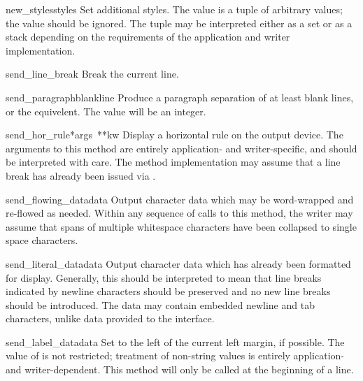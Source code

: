 \begin{funcdesc}{new_styles}{styles}
Set additional styles.  The  value is a tuple of
arbitrary values; the value  should be ignored.  The
 tuple may be interpreted either as a set or as a stack
depending on the requirements of the application and writer
implementation.
\end{funcdesc}

\begin{funcdesc}{send_line_break}{}
Break the current line.
\end{funcdesc}

\begin{funcdesc}{send_paragraph}{blankline}
Produce a paragraph separation of at least  blank
lines, or the equivelent.  The  value will be an
integer.
\end{funcdesc}

\begin{funcdesc}{send_hor_rule}{*args\, **kw}
Display a horizontal rule on the output device.  The arguments to this
method are entirely application- and writer-specific, and should be
interpreted with care.  The method implementation may assume that a
line break has already been issued via .
\end{funcdesc}

\begin{funcdesc}{send_flowing_data}{data}
Output character data which may be word-wrapped and re-flowed as
needed.  Within any sequence of calls to this method, the writer may
assume that spans of multiple whitespace characters have been
collapsed to single space characters.
\end{funcdesc}

\begin{funcdesc}{send_literal_data}{data}
Output character data which has already been formatted
for display.  Generally, this should be interpreted to mean that line
breaks indicated by newline characters should be preserved and no new
line breaks should be introduced.  The data may contain embedded
newline and tab characters, unlike data provided to the
 interface.
\end{funcdesc}

\begin{funcdesc}{send_label_data}{data}
Set  to the left of the current left margin, if possible.
The value of  is not restricted; treatment of non-string
values is entirely application- and writer-dependent.  This method
will only be called at the beginning of a line.
\end{funcdesc}


